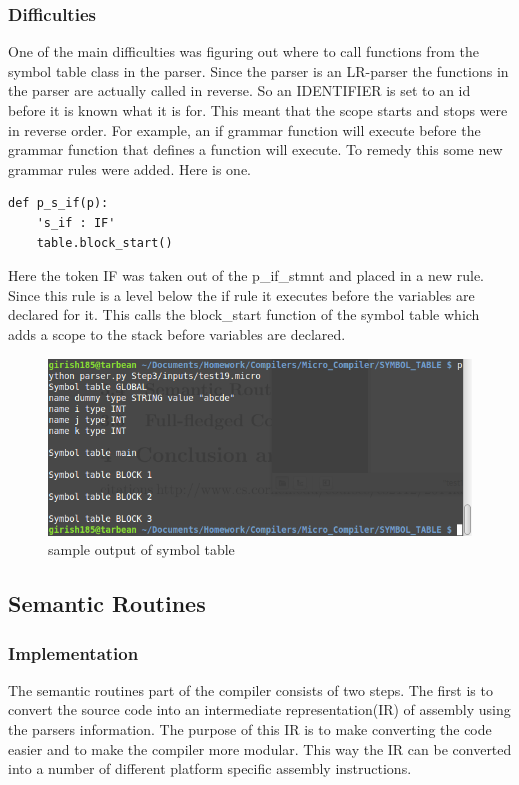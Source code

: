 \documentclass[12pt, oneside]{article}   	%
\begin{document}
\subsubsection{Difficulties}
One of the main difficulties was figuring out where to call functions from the symbol table class in the parser. Since the parser is an LR-parser the functions in the parser are actually called in reverse. So an IDENTIFIER is set to an id before it is known what it is for. This meant that the scope starts and stops were in reverse order. For example, an if grammar function will execute before the grammar function that defines a function will execute. To remedy this some new grammar rules were added. Here is one.

\begin{lstlisting}
def p_s_if(p):
	's_if : IF'
	table.block_start()
\end{lstlisting}
	Here the token IF was taken out of the p\_if\_stmnt and placed in a new rule. Since this rule is a level below the if rule it executes before the variables are declared for it. This calls the block\_start function of the symbol table which adds a scope to the stack before variables are declared.
	
	\begin{figure}[h!]
		\centerline{\includegraphics[width=.4\linewidth]{pics/sybol_output}}
		\caption{sample output of symbol table}
	\end{figure}
	
\subsection{Semantic Routines}
\subsubsection{Implementation}
The semantic routines part of the compiler consists of two steps. The first is to convert the source code into an intermediate representation(IR) of assembly using the parsers information. The purpose of this IR is to make converting the code easier and to make the compiler more modular. This way the IR can be converted into a number of different platform specific assembly instructions.
\end{document}
